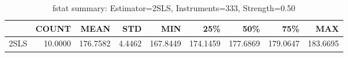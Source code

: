 \begin{table}[ht]
\centering
\caption{fstat summary: Estimator=2SLS, Instruments=333, Strength=0.50}
\begin{tabular}{lrrrrrrrr}
\toprule
 & COUNT & MEAN & STD & MIN & 25\% & 50\% & 75\% & MAX \\
\midrule
2SLS & 10.0000 & 176.7582 & 4.4462 & 167.8449 & 174.1459 & 177.6869 & 179.0647 & 183.6695 \\
\bottomrule
\end{tabular}
\end{table}
